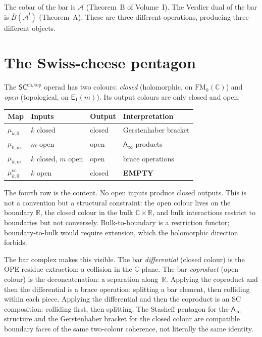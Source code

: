 \documentclass[11pt]{article}
\newcommand{\cA}{\mathcal{A}}
\newcommand{\barB}{\overline{B}}
\newcommand{\C}{\mathbb{C}}
\newcommand{\R}{\mathbb{R}}
\newcommand{\Eone}{\mathsf{E}_1}
\newcommand{\Ainf}{\mathsf{A}_{\infty}}
\newcommand{\SCchtop}{\mathsf{SC}^{\mathrm{ch,top}}}
\newcommand{\FM}{\mathrm{FM}}
\begin{document}
\medskip

The cobar of the bar is $\cA$ (Theorem~B of Volume~I).  The
Verdier dual of the bar is $\barB(\cA^!)$ (Theorem~A).  These
are three different operations, producing three different
objects.


\section{The Swiss-cheese pentagon}
\label{sec:pentagon}

The $\SCchtop$ operad has two colours: \textit{closed}
(holomorphic, on $\FM_k(\C)$) and \textit{open} (topological,
on $\Eone(m)$).  Its output colours are only closed and open:

\begin{center}
\small
\renewcommand{\arraystretch}{1.15}
\begin{tabular}{@{}llll@{}}
\textbf{Map} & \textbf{Inputs} & \textbf{Output}
  & \textbf{Interpretation} \\
\hline
$\mu_{k,0}$ & $k$ closed & closed
  & Gerstenhaber bracket \\[3pt]
$\mu_{0,m}$ & $m$ open & open
  & $\Ainf$ products \\[3pt]
$\mu_{k,m}$ & $k$ closed, $m$ open & open
  & brace operations \\[3pt]
$\mu_{k,0}^{\mathrm{oc}}$ & $k$ open & closed
  & \textbf{EMPTY} \\[3pt]
\end{tabular}
\end{center}

\medskip

The fourth row is the content.  No open inputs produce closed
outputs.  This is not a convention but a structural constraint:
the open colour lives on the boundary $\R$, the closed colour in
the bulk $\C \times \R$, and bulk interactions restrict to
boundaries but not conversely.  Bulk-to-boundary is a restriction
functor; boundary-to-bulk would require extension, which the
holomorphic direction forbids.

The bar complex makes this visible.  The bar \textit{differential}
(closed colour) is the OPE residue extraction: a collision in the
$\C$-plane.  The bar \textit{coproduct} (open colour) is the
deconcatenation: a separation along~$\R$.  Applying the coproduct
and then the differential is a brace operation: splitting a bar
element, then colliding within each piece.  Applying the
differential and then the coproduct is an SC composition:
colliding first, then splitting.  The Stasheff pentagon for the
$\Ainf$ structure and the Gerstenhaber bracket for the closed
colour are compatible boundary faces of the same two-colour
coherence, not literally the same identity.
\end{document}
